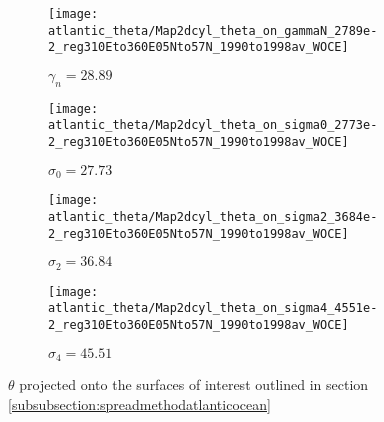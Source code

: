 \begin{figure}[htbp]
    \centering
    \begin{subfigure}[b]{0.4\textwidth}
         \centering
         \texttt{[image: atlantic\_theta/Map2dcyl\_theta\_on\_gammaN\_2789e-2\_reg310Eto360E05Nto57N\_1990to1998av\_WOCE]}
         \caption{$\gamma_n = 28.89$}
         \label{fig:subplot_atlantic_theta_gammaN}
     \end{subfigure}
     \hfill
     \begin{subfigure}[b]{0.4\textwidth}
         \centering
         \texttt{[image: atlantic\_theta/Map2dcyl\_theta\_on\_sigma0\_2773e-2\_reg310Eto360E05Nto57N\_1990to1998av\_WOCE]}
         \caption{$\sigma_0 = 27.73$}
         \label{fig:subplot_atlantic_theta_sig0}
     \end{subfigure}
     \begin{subfigure}[b]{0.4\textwidth}
         \centering
         \texttt{[image: atlantic\_theta/Map2dcyl\_theta\_on\_sigma2\_3684e-2\_reg310Eto360E05Nto57N\_1990to1998av\_WOCE]}
         \caption{$\sigma_2 = 36.84$}
         \label{fig:subplot_atlantic_theta_sig2}
     \end{subfigure}
     \hfill
     \begin{subfigure}[b]{0.4\textwidth}
         \centering
         \texttt{[image: atlantic\_theta/Map2dcyl\_theta\_on\_sigma4\_4551e-2\_reg310Eto360E05Nto57N\_1990to1998av\_WOCE]}
         \caption{$\sigma_4 = 45.51$}
         \label{fig:subplot_atlantic_theta_sig4}
     \end{subfigure}
    \caption{$\theta$ projected onto the surfaces of interest outlined in section \ref{subsubsection:spreadmethodatlanticocean}}
    \label{fig:atlantic_theta}
    
\end{figure}

